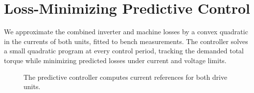 \chapter{Loss-Minimizing Predictive Control}
\label{ch:method}

We approximate the combined inverter and machine losses by a convex quadratic in the currents
of both units, fitted to bench measurements. The controller solves a small quadratic program
at every control period, tracking the demanded total torque while minimizing predicted losses
under current and voltage limits.

\begin{figure}[htbp]
  \centering
  \caption{The predictive controller computes current references for both drive units.}
  \label{fig:mpc}
\end{figure}
